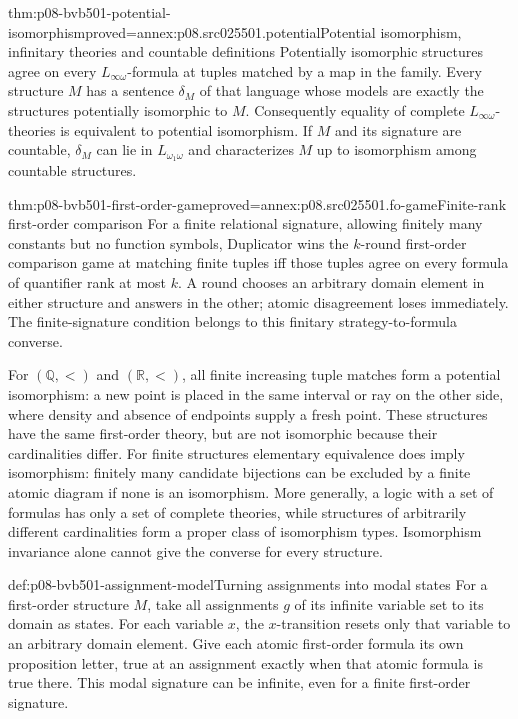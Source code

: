 \begin{hbtheorem}{thm:p08-bvb501-potential-isomorphism}{proved=annex:p08.src025501.potential}{Potential isomorphism, infinitary theories and countable definitions}
Potentially isomorphic structures agree on every
\(L_{\infty\omega}\)-formula at tuples matched by a map in the family.
Every structure \(M\) has a sentence \(\delta_M\) of that language
whose models are exactly the structures potentially isomorphic to \(M\).
Consequently equality of complete \(L_{\infty\omega}\)-theories is
equivalent to potential isomorphism.
If \(M\) and its signature are countable, \(\delta_M\) can lie in
\(L_{\omega_1\omega}\) and characterizes \(M\) up to isomorphism
among countable structures.
\end{hbtheorem}

\begin{hblemma}{thm:p08-bvb501-first-order-game}{proved=annex:p08.src025501.fo-game}{Finite-rank first-order comparison}
For a finite relational signature, allowing finitely many constants but
no function symbols, Duplicator wins the \(k\)-round first-order
comparison game at matching finite tuples iff those tuples agree on every
formula of quantifier rank at most \(k\). A round chooses an arbitrary
domain element in either structure and answers in the other; atomic
disagreement loses immediately. The finite-signature condition belongs
to this finitary strategy-to-formula converse.
\end{hblemma}

For \((\mathbb Q,<)\) and \((\mathbb R,<)\), all finite increasing
tuple matches form a potential isomorphism: a new point is placed in the
same interval or ray on the other side, where density and absence of
endpoints supply a fresh point. These structures have the same first-order
theory, but are not isomorphic because their cardinalities differ.
For finite structures elementary equivalence does imply isomorphism:
finitely many candidate bijections can be excluded by a finite atomic diagram
if none is an isomorphism. More generally, a logic with a set of formulas has
only a set of complete theories, while structures of arbitrarily different
cardinalities form a proper class of isomorphism types. Isomorphism invariance
alone cannot give the converse for every structure.

\begin{hbdefinition}{def:p08-bvb501-assignment-model}{Turning assignments into modal states}
For a first-order structure \(M\), take all assignments \(g\) of its infinite
variable set to its domain as states. For each variable \(x\), the
\(x\)-transition resets only that variable to an arbitrary domain element.
Give each atomic first-order formula its own proposition letter, true at
an assignment exactly when that atomic formula is true there.
This modal signature can be infinite, even for a finite first-order signature.
\end{hbdefinition}

